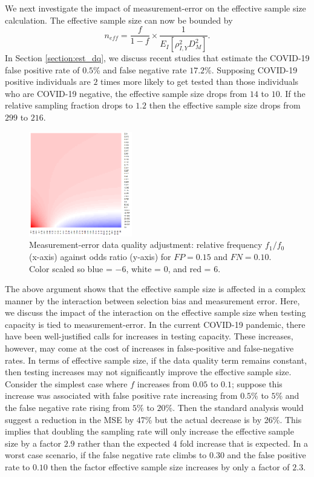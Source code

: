 \documentclass[aoas]{amsart}
\begin{document}
We next investigate the impact of measurement-error on the effective sample size calculation.  The effective sample size can now be bounded by
$$
n_{eff} = \frac{f}{1-f} \times \frac{1}{E_{I} \left[ \rho_{I,Y}^2 D_M^2 \right]}.
$$
In Section \ref{section:est_dq}, we discuss recent studies that estimate the COVID-19 false positive rate of $0.5$\% and false negative rate $17.2$\%.  Supposing COVID-19 positive individuals are $2$ times more likely to get tested than those individuals who are COVID-19 negative, the effective sample size drops from $14$ to $10$. If the relative sampling fraction drops to $1.2$ then the effective sample size drops from $299$ to $216$.

\begin{figure}
\centering
\includegraphics[width = 0.4\textwidth]{../methods/figs/mem_heatmap_article.png}
\caption{Measurement-error data quality adjustment: relative frequency $f_1/f_0$ (x-axis) against odds ratio (y-axis) for $FP=0.15$ and $FN=0.10$. Color scaled so blue = $-6$, white = 0, and red = $6$.}
\label{fig:heatmap}
\vspace{-0.3cm}
\end{figure}


The above argument shows that the effective sample size is affected in a complex manner by the interaction between selection bias and measurement error.  Here, we discuss the impact of the interaction on the effective sample size when testing capacity is tied to measurement-error.  In the current COVID-19 pandemic, there have been well-justified calls for increases in testing capacity.  These increases, however, may come at the cost of increases in false-positive and false-negative rates.  In terms of effective sample size, if the data quality term remains constant, then testing increases may not significantly improve the effective sample size.  Consider the simplest case where $f$ increases from $0.05$ to $0.1$; suppose this increase was associated with  false positive rate increasing from $0.5$\% to $5$\% and the false negative rate rising from $5\%$ to $20$\%.  Then the standard analysis would suggest a reduction in the MSE by 47\% but the actual decrease is by 26\%.  This implies that doubling the sampling rate will only increase the effective sample size by a factor $2.9$ rather than the expected $4$ fold increase that is expected.  In a worst case scenario, if the false negative rate climbs to $0.30$ and the false positive rate to $0.10$ then the factor effective sample size increases by only a factor of $2.3$.
\end{document}

